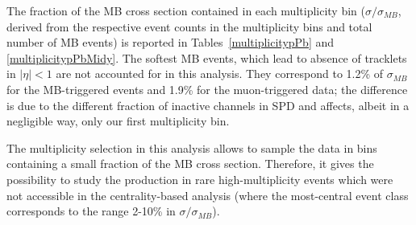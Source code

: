 The fraction of the MB cross section contained in each multiplicity bin ($\sigma / \sigma_{MB}$, derived from the respective event counts in the multiplicity bins and total number of MB events) is reported in Tables~\ref{multiplicitypPb} and \ref{multiplicitypPbMidy}. The softest MB events, which lead to absence of tracklets in $|\eta|<1$ are not accounted for in this analysis. They correspond to 
1.2\% of $\sigma_{MB}$ for the MB-triggered events and 1.9\% for the muon-triggered data; the difference is due to the different fraction of inactive channels in SPD and affects, albeit in a negligible way, only our first multiplicity bin.

The multiplicity selection in this analysis allows to sample the data in bins containing a small fraction of the MB cross section. Therefore, it gives the possibility to study the \jpsi production in rare high-multiplicity events which were not accessible in the centrality-based analysis \cite{Adam:2015jsa} (where the most-central event class corresponds to the range 2-10\% in $\sigma / \sigma_{MB}$).
